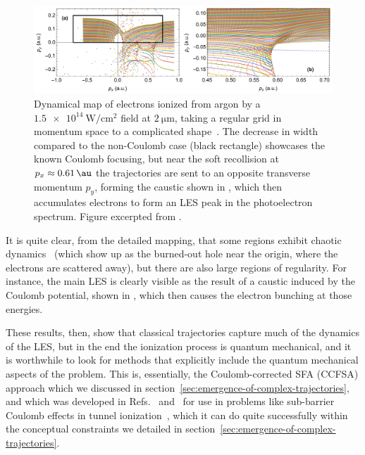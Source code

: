 \begin{figure}[htb]
  \centering
  \subfigure{\label{f6-kelvich-original-figure-a}}
  \subfigure{\label{f6-kelvich-original-figure-b}}
  \includegraphics[width=392pt]{6-LES/Figures/figure6K.png}
  \caption[
  High-resolution dynamical map of full classical photoelectron trajectories, showing LES bunching as the result of a caustic in the dynamical map, as calculated by S.A. Kelvich et al.
  ]{
  Dynamical map of electrons ionized from argon by a $\SI{1.5e14}{\watt/\centi\meter^2}$ field at $\SI{2}{\micro\meter}$, taking a regular grid in momentum space to a complicated shape~\cite{kelvich_coulomb-focusing_2015}. The decrease in width compared to the non-Coulomb case (black rectangle) showcases the known Coulomb focusing, but near the soft recollision at $p_x\approx\SI{0.61}{\au}$ the trajectories are sent to an opposite transverse momentum $p_y$, forming the caustic shown in \protect{}, which then accumulates electrons to form an LES peak in the photoelectron spectrum.
  Figure excerpted from .
  }
\label{f6-kelvich-dynamical-map}
\end{figure}

It is quite clear, from the detailed mapping, that some regions exhibit chaotic dynamics~\cite{chaotic_dynamics} (which show up as the burned-out hole near the origin, where the electrons are scattered away), but there are also large regions of regularity. For instance, the main LES is clearly visible as the result of a caustic induced by the Coulomb potential, shown in , which then causes the electron bunching at those energies.





These results, then, show that classical trajectories capture much of the dynamics of the LES, but in the end the ionization process is quantum mechanical, and it is worthwhile to look for methods that explicitly include the quantum mechanical aspects of the problem. This is, essentially, the Coulomb-corrected SFA (CCFSA) approach which we discussed in section~\ref{sec:emergence-of-complex-trajectories}, and which was developed in Refs.~\citealp{CCSFA_initial_short} and~\citealp{ CCSFA_initial_full} for use in problems like sub-barrier Coulomb effects in tunnel ionization~\cite{TCSFA_sub_barrier}, which it can do quite successfully within the conceptual constraints we detailed in section~\ref{sec:emergence-of-complex-trajectories}.

